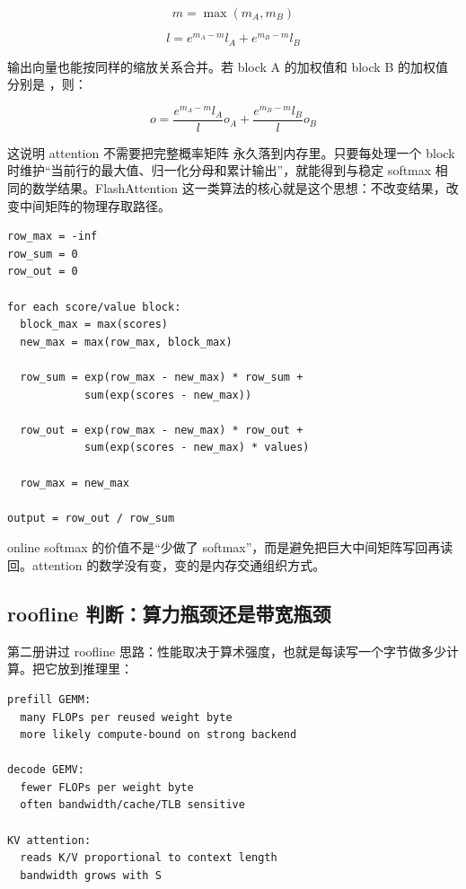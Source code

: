 \[
m = \max(m_A, m_B)
\]

\[
l = e^{m_A-m}l_A + e^{m_B-m}l_B
\]

输出向量也能按同样的缩放关系合并。若 block A 的加权值和 block B 的加权值分别是 ，则：

\[
o = \frac{e^{m_A-m}l_A}{l} o_A +
\frac{e^{m_B-m}l_B}{l} o_B
\]

这说明 attention 不需要把完整概率矩阵  永久落到内存里。只要每处理一个 block 时维护“当前行的最大值、归一化分母和累计输出”，就能得到与稳定 softmax 相同的数学结果。FlashAttention 这一类算法的核心就是这个思想：不改变结果，改变中间矩阵的物理存取路径。

\begin{lstlisting}[numbers=none,caption={一行 attention 的 online softmax 直觉}]
row_max = -inf
row_sum = 0
row_out = 0

for each score/value block:
  block_max = max(scores)
  new_max = max(row_max, block_max)

  row_sum = exp(row_max - new_max) * row_sum +
            sum(exp(scores - new_max))

  row_out = exp(row_max - new_max) * row_out +
            sum(exp(scores - new_max) * values)

  row_max = new_max

output = row_out / row_sum
\end{lstlisting}

\begin{keyidea}
online softmax 的价值不是“少做了 softmax”，而是避免把巨大中间矩阵写回再读回。attention 的数学没有变，变的是内存交通组织方式。
\end{keyidea}

\subsection{roofline 判断：算力瓶颈还是带宽瓶颈}

第二册讲过 roofline 思路：性能取决于算术强度，也就是每读写一个字节做多少计算。把它放到推理里：

\begin{lstlisting}[numbers=none,caption={推理阶段的算术强度直觉}]
prefill GEMM:
  many FLOPs per reused weight byte
  more likely compute-bound on strong backend

decode GEMV:
  fewer FLOPs per weight byte
  often bandwidth/cache/TLB sensitive

KV attention:
  reads K/V proportional to context length
  bandwidth grows with S
\end{lstlisting}

